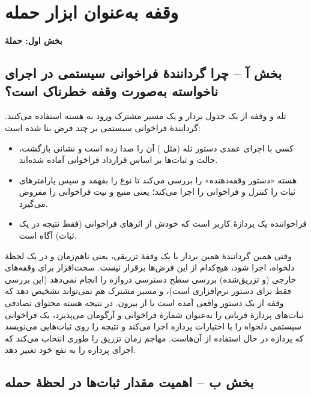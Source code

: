 \section{وقفه به‌عنوان ابزار حمله}

\textbf{بخش اول: حملهٔ }

\subsection*{بخش آ – چرا گردانندهٔ فراخوانی سیستمی در اجرای ناخواسته به‌صورت وقفه خطرناک است؟}

تله و وقفه از یک جدول بردار و یک مسیر مشترک ورود به هسته استفاده می‌کنند. گردانندهٔ فراخوانی سیستمی بر چند فرض بنا شده است:
\begin{itemize}
  \item کسی با اجرای عمدی دستور تله (مثل ) آن را صدا زده است و نشانی بازگشت، حالت و ثبات‌ها بر اساس قرارداد فراخوانی آماده شده‌اند.
  \item هسته «دستور وقفه‌دهنده» را بررسی می‌کند تا نوع را بفهمد و سپس پارامترهای ثبات را کنترل و فراخوانی را اجرا می‌کند؛ یعنی منبع و نیت فراخوانی را مفروض می‌گیرد.
  \item فراخواننده یک پردازهٔ کاربر است که خودش از اثرهای فراخوانی (فقط نتیجه در یک ثبات) آگاه است.
\end{itemize}

وقتی همین گردانندهٔ همین بردار با یک وقفهٔ تزریقی، یعنی ناهم‌زمان و در یک لحظهٔ دلخواه، اجرا شود، هیچ‌کدام از این فرض‌ها برقرار نیست. سخت‌افزار برای وقفه‌های خارجی (و تزریق‌شده) بررسی سطح دسترسی دروازه را انجام نمی‌دهد (این بررسی فقط برای دستور نرم‌افزاری  است)، و مسیر مشترک هم نمی‌تواند تشخیص دهد که وقفه از یک دستور واقعی آمده است یا از بیرون. در نتیجه هسته محتوای تصادفی ثبات‌های پردازهٔ قربانی را به‌عنوان شمارهٔ فراخوانی و آرگومان می‌پذیرد، یک فراخوانی سیستمی دلخواه را با اختیارات پردازه اجرا می‌کند و نتیجه را روی ثبات‌هایی می‌نویسد که پردازه در حال استفاده از آن‌هاست. مهاجم زمان تزریق را طوری انتخاب می‌کند که اجرای پردازه را به نفع خود تغییر دهد.

\subsection*{بخش ب – اهمیت مقدار ثبات‌ها در لحظهٔ حمله}

